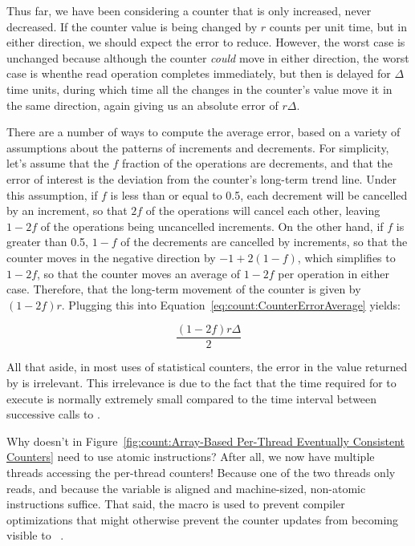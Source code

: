 	Thus far, we have been considering a counter that is only
	increased, never decreased.
	If the counter value is being changed by $r$ counts per unit
	time, but in either direction, we should expect the error
	to reduce.
	However, the worst case is unchanged because although the
	counter \emph{could} move in either direction, the worst
	case is whenthe read operation completes immediately,
	but then is delayed for $\Delta$ time units, during which
	time all the changes in the counter's value move it in
	the same direction, again giving us an absolute error
	of $r \Delta$.

	There are a number of ways to compute the average error,
	based on a variety of assumptions about the patterns of
	increments and decrements.
	For simplicity, let's assume that the $f$ fraction of
	the operations are decrements, and that the error of interest
	is the deviation from the counter's long-term trend line.
	Under this assumption, if $f$ is less than or equal to 0.5,
	each decrement will be cancelled by an increment, so that
	$2f$ of the operations will cancel each other, leaving
	$1-2f$ of the operations being uncancelled increments.
	On the other hand, if $f$ is greater than 0.5, $1-f$ of
	the decrements are cancelled by increments, so that the
	counter moves in the negative direction by $-1+2\left(1-f\right)$,
	which simplifies to $1-2f$, so that the counter moves an average
	of $1-2f$ per operation in either case.
	Therefore, that the long-term
	movement of the counter is given by $\left( 1-2f \right) r$.
	Plugging this into
	Equation~\ref{eq:count:CounterErrorAverage} yields:

	\begin{equation}
		\frac{\left( 1 - 2 f \right) r \Delta}{2}
	\end{equation}

	All that aside, in most uses of statistical counters, the
	error in the value returned by  is
	irrelevant.
	This irrelevance is due to the fact that the time required
	for  to execute is normally extremely
	small compared to the time interval between successive
	calls to .

\QuickQ{}
	Why doesn't  in
	Figure~\ref{fig:count:Array-Based Per-Thread Eventually Consistent Counters}
	need to use atomic instructions?
	After all, we now have multiple threads accessing the per-thread
	counters!
\QuickA{}
	Because one of the two threads only reads, and because the
	variable is aligned and machine-sized, non-atomic instructions
	suffice.
	That said, the  macro is used to prevent
	compiler optimizations that might otherwise prevent the
	counter updates from becoming visible to
	~\cite{JonCorbet2012ACCESS:ONCE}.

